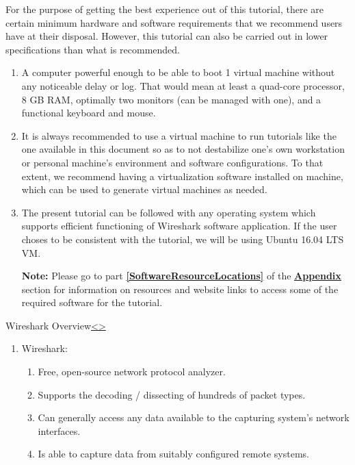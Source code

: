 \documentclass[12pt]{extarticle}
\newenvironment{instructionblock}{\Large\bgroup}{\egroup}
\newcommand{\ben}{\begin{enumerate}}
\newcommand{\een}{\end{enumerate}}
\begin{document}
\vspace{4mm}
\noindent
For the purpose of getting the best experience out of this tutorial, there are certain minimum hardware and software requirements that we recommend users have at their disposal. However, this tutorial can also be carried out in lower specifications than what is recommended.

\ben

\item A computer powerful enough to be able to boot 1 virtual machine without any noticeable delay or log. That would mean at least a quad-core processor, 8 GB RAM, optimally two monitors (can be managed with one), and a functional keyboard and mouse.

\item It is always recommended to use a virtual machine to run tutorials like the one available in this document so as to not destabilize one's own workstation or personal machine's environment and software configurations. To that extent, we recommend having a virtualization software installed on machine, which can be used to generate virtual machines as needed. 

\item The present tutorial can be followed with any operating system which supports efficient functioning of Wireshark software application. If the user choses to be consistent with the tutorial, we will be using Ubuntu 16.04 LTS VM.  

\textbf{Note:} Please go to part \textbf{\underline{\ref{SoftwareResourceLocations}}} of the {\textbf{\hyperref[slide 27]{\underline{Appendix}}}} section for information on resources and website links to access some of the required software for the tutorial.

\een


\pagebreak
\begin{slide}{Wireshark Overview}{\hyperref[slide 3]{\textless}\hyperref[slide 5]{\textgreater}}
	\begin{instructionblock}
		\begin{enumerate}
			\item Wireshark:
			\ben
				\item Free, open-source network protocol analyzer.
				\item Supports the decoding / dissecting of hundreds of packet types.
				\item Can generally access any data available to the capturing system's network interfaces.
				\item Is able to capture data from suitably configured remote systems.
			\een
		\end{enumerate}
	\end{instructionblock}
\end{slide}
\vfill
\end{document}
